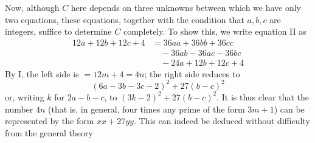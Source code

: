 Now, although \(C\) here depends on three unknowns between which we have only two equations, these equations, together with the condition that \(a,\allowbreak b,\allowbreak c\) are integers, suffice to determine \(C\) completely. To show this, we write equation II as \[\begin{aligned}12a+12b+12c+4&=36aa+36bb+36cc\\&\quad-36ab-36ac-36bc\\&\quad-24a+12b+12c+4\end{aligned}\] By I, the left side is \(=12m+4=4n\); the right side reduces to \[(6a-3b-3c-2)^2+27(b-c)^2\] or, writing \(k\) for \(2a-b-c\), to \((3k-2)^2+27(b-c)^2\). It is thus clear that the number \(4n\) (that is, in general, four times any prime of the form \(3m+1\)) can be represented by the form \(xx+27yy\). This can indeed be deduced without difficulty from the general theory
